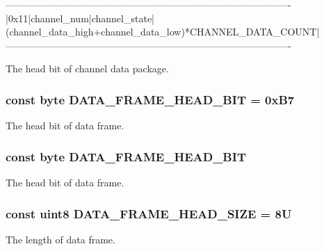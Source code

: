 \begin{DoxyVerb}----------------------------------------------------------------------------------------
|0x11|channel_num|channel_state|(channel_data_high+channel_data_low)*CHANNEL_DATA_COUNT|
----------------------------------------------------------------------------------------
\end{DoxyVerb}
The head bit of channel data package. \hypertarget{group___a_r_m_const_ga15cb3f9fa8e0523169e74e81acc2bc27}{
\subsubsection[{D\-A\-T\-A\-\_\-\-F\-R\-A\-M\-E\-\_\-\-H\-E\-A\-D\-\_\-\-B\-I\-T}]{\setlength{\rightskip}{0pt plus 5cm}const byte D\-A\-T\-A\-\_\-\-F\-R\-A\-M\-E\-\_\-\-H\-E\-A\-D\-\_\-\-B\-I\-T = 0x\-B7}}\label{group___a_r_m_const_ga15cb3f9fa8e0523169e74e81acc2bc27}
The head bit of data frame. \hypertarget{group___a_r_m_const_ga15cb3f9fa8e0523169e74e81acc2bc27}{
\subsubsection[{D\-A\-T\-A\-\_\-\-F\-R\-A\-M\-E\-\_\-\-H\-E\-A\-D\-\_\-\-B\-I\-T}]{\setlength{\rightskip}{0pt plus 5cm}const byte D\-A\-T\-A\-\_\-\-F\-R\-A\-M\-E\-\_\-\-H\-E\-A\-D\-\_\-\-B\-I\-T}}\label{group___a_r_m_const_ga15cb3f9fa8e0523169e74e81acc2bc27}
The head bit of data frame. \hypertarget{group___a_r_m_const_ga44f6170bf5a312cd050f5a8dbcf3d4de}{
\subsubsection[{D\-A\-T\-A\-\_\-\-F\-R\-A\-M\-E\-\_\-\-H\-E\-A\-D\-\_\-\-S\-I\-Z\-E}]{\setlength{\rightskip}{0pt plus 5cm}const uint8 D\-A\-T\-A\-\_\-\-F\-R\-A\-M\-E\-\_\-\-H\-E\-A\-D\-\_\-\-S\-I\-Z\-E = 8\-U}}\label{group___a_r_m_const_ga44f6170bf5a312cd050f5a8dbcf3d4de}
The length of data frame.

